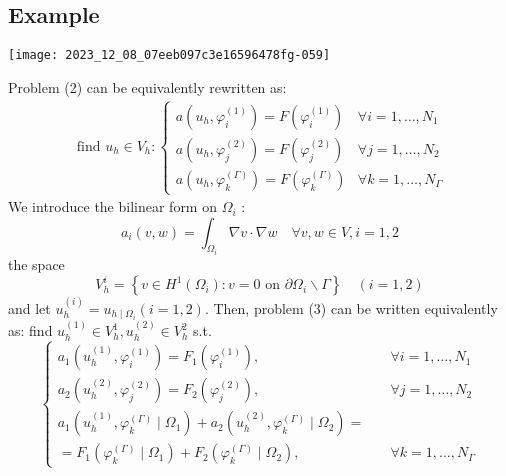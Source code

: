 \documentclass[11pt]{book}
\begin{document}
\subsection*{Example}
\begin{center}
\texttt{[image: 2023\_12\_08\_07eeb097c3e16596478fg-059]}
\end{center}
Problem (2) can be equivalently rewritten as:
\begin{equation}
\begin{aligned}
\text { find } u_{h} \in V_{h}: \begin{cases}a\left(u_{h}, \varphi_{i}^{(1)}\right)=F\left(\varphi_{i}^{(1)}\right) & \forall i=1, \ldots, N_{1} \\ a\left(u_{h}, \varphi_{j}^{(2)}\right)=F\left(\varphi_{j}^{(2)}\right) & \forall j=1, \ldots, N_{2} \\ a\left(u_{h}, \varphi_{k}^{(\Gamma)}\right)=F\left(\varphi_{k}^{(\Gamma)}\right) & \forall k=1, \ldots, N_{\Gamma}\end{cases}
\end{aligned}
\end{equation}
We introduce the bilinear form on $\Omega_{i}$ :
$$
a_{i}(v, w)=\int_{\Omega_{i}} \nabla v \cdot \nabla w \quad \forall v, w \in V, i=1,2
$$
the space
$$
V_{h}^{i}=\left\{v \in H^{1}\left(\Omega_{i}\right): v=0 \text { on } \partial \Omega_{i} \backslash \Gamma\right\} \quad(i=1,2)
$$
and let $u_{h}^{(i)}=u_{h \mid \Omega_{i}}(i=1,2)$.
Then, problem (3) can be written equivalently as:
find $u_{h}^{(1)} \in V_{h}^{1}, u_{h}^{(2)} \in V_{h}^{2}$ s.t.
\begin{equation}
\left\{
\begin{aligned}
a_{1}\left(u_{h}^{(1)}, \varphi_{i}^{(1)}\right) = F_{1}\left(\varphi_{i}^{(1)}\right), & \quad \forall i=1, \ldots, N_{1} \\
a_{2}\left(u_{h}^{(2)}, \varphi_{j}^{(2)}\right) = F_{2}\left(\varphi_{j}^{(2)}\right), & \quad \forall j=1, \ldots, N_{2} \\
a_{1}\left(u_{h}^{(1)}, \varphi_{k}^{(\Gamma)} \mid \Omega_{1}\right) + a_{2}\left(u_{h}^{(2)}, \varphi_{k}^{(\Gamma)} \mid \Omega_{2}\right) = \\ =F_{1}\left(\varphi_{k}^{(\Gamma)} \mid \Omega_{1}\right) + F_{2}\left(\varphi_{k}^{(\Gamma)} \mid \Omega_{2}\right), & \quad \forall k=1, \ldots, N_{\Gamma}
\end{aligned}
\right.
\end{equation}
\end{document}
